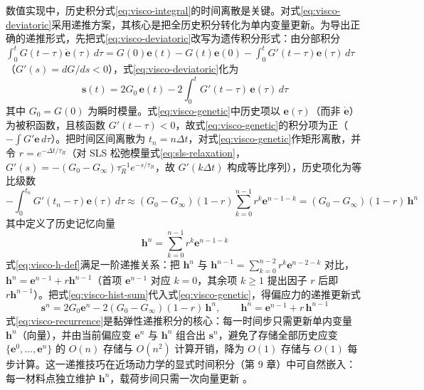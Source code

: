 数值实现中，历史积分式\eqref{eq:visco-integral}的时间离散是关键。对式\eqref{eq:visco-deviatoric}采用递推方案，其核心是把全历史积分转化为单内变量更新。为导出正确的递推形式，先把式\eqref{eq:visco-deviatoric}改写为遗传积分形式：由分部积分 $\int_{0}^{t}G(t-\tau)\dot{\mathbf{e}}(\tau)\,d\tau=G(0)\mathbf{e}(t)-G(t)\mathbf{e}(0)-\int_{0}^{t}G'(t-\tau)\mathbf{e}(\tau)\,d\tau$（$G'(s)=dG/ds<0$），式\eqref{eq:visco-deviatoric}化为
\begin{equation}
  \mathbf{s}(t)=2G_{0}\,\mathbf{e}(t)-2\int_{0}^{t}G'(t-\tau)\,\mathbf{e}(\tau)\,d\tau
  \label{eq:visco-genetic}
\end{equation}
其中 $G_{0}=G(0)$ 为瞬时模量。式\eqref{eq:visco-genetic}中历史项以 $\mathbf{e}(\tau)$（而非 $\dot{\mathbf{e}}$）为被积函数，且核函数 $G'(t-\tau)<0$，故式\eqref{eq:visco-genetic}的积分项为正（$-\int G'\mathbf{e}\,d\tau$）。把时间区间离散为 $t_{n}=n\Delta t$，对式\eqref{eq:visco-genetic}作矩形离散，并令 $r=e^{-\Delta t/\tau_{R}}$（对 SLS 松弛模量式\eqref{eq:sls-relaxation}，$G'(s)=-(G_{0}-G_{\infty})\tau_{R}^{-1}e^{-s/\tau_{R}}$，故 $G'(k\Delta t)$ 构成等比序列），历史项化为等比级数
\begin{equation}
  -\int_{0}^{t_{n}}G'(t_{n}-\tau)\mathbf{e}(\tau)\,d\tau
  \approx (G_{0}-G_{\infty})(1-r)\sum_{k=0}^{n-1}r^{k}\mathbf{e}^{n-1-k}
  =(G_{0}-G_{\infty})(1-r)\,\mathbf{h}^{n}
  \label{eq:visco-hist-sum}
\end{equation}
其中定义了历史记忆向量
\begin{equation}
  \mathbf{h}^{n}=\sum_{k=0}^{n-1}r^{k}\mathbf{e}^{n-1-k}
  \label{eq:visco-h-def}
\end{equation}
式\eqref{eq:visco-h-def}满足一阶递推关系：把 $\mathbf{h}^{n}$ 与 $\mathbf{h}^{n-1}=\sum_{k=0}^{n-2}r^{k}\mathbf{e}^{n-2-k}$ 对比，$\mathbf{h}^{n}=\mathbf{e}^{n-1}+r\mathbf{h}^{n-1}$（首项 $\mathbf{e}^{n-1}$ 对应 $k=0$，其余项 $k\ge1$ 提出因子 $r$ 后即 $r\mathbf{h}^{n-1}$）。把式\eqref{eq:visco-hist-sum}代入式\eqref{eq:visco-genetic}，得偏应力的递推更新式
\begin{equation}
  \mathbf{s}^{n}=2G_{0}\mathbf{e}^{n}-2(G_{0}-G_{\infty})(1-r)\,\mathbf{h}^{n},
  \qquad
  \mathbf{h}^{n}=\mathbf{e}^{n-1}+r\,\mathbf{h}^{n-1}
  \label{eq:visco-recurrence}
\end{equation}
式\eqref{eq:visco-recurrence}是黏弹性递推积分的核心：每一时间步只需更新单内变量 $\mathbf{h}^{n}$（向量），并由当前偏应变 $\mathbf{e}^{n}$ 与 $\mathbf{h}^{n}$ 组合出 $\mathbf{s}^{n}$，避免了存储全部历史应变 $\{\mathbf{e}^{0},\ldots,\mathbf{e}^{n}\}$ 的 $O(n)$ 存储与 $O(n^{2})$ 计算开销，降为 $O(1)$ 存储与 $O(1)$ 每步计算。这一递推技巧在近场动力学的显式时间积分（第 9 章）中可自然嵌入：每一材料点独立维护 $\mathbf{h}^{n}$，载荷步间只需一次向量更新 \cite{Galadima2024}。

